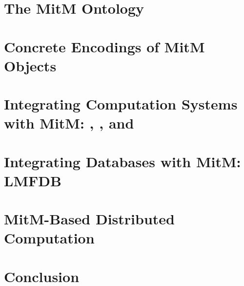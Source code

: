 \documentclass[book]{deliverablereport}
\begin{document}
\section[MitM Ontology]{The MitM Ontology}\label{sec:cgt}
\newpage


\section{Concrete Encodings of MitM Objects}\label{sec:codecs}
\newpage

\section[Computation Systems]{Integrating Computation Systems with MitM: \GAP, \Sage, and \Singular}\label{sec:apit}
\newpage

\section[Databases]{Integrating Databases with MitM: LMFDB}\label{sec:databases}
\newpage
\section[Distributed Computation]{MitM-Based Distributed Computation}\label{sec:case}
\newpage

\section{Conclusion}\label{sec:concl}


\printbibliography
\end{document}
